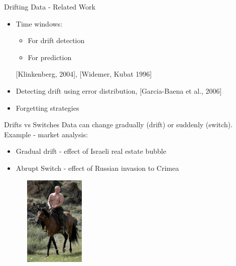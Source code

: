 \documentclass{beamer}
\begin{document}
\begin{frame}{Drifting Data - Related Work}


\begin{itemize}
\item Time windows:\newline
\begin{itemize}
\item For drift detection\newline
\item For prediction\newline
\end{itemize}
[Klinkenberg, 2004], [Widemer, Kubat 1996]\newline
\item Detecting drift using error distribution\newline\newline
[Gama et al., 2004], [Garcia-Baena et al., 2006]\newline
\item Forgetting strategies\newline{}
\end{itemize}
\end{frame}

\begin{frame}{Drifts vs Switches}
Data can change gradually (drift) or suddenly (switch). \newline\newline
Example - market analysis:\newline
\begin{itemize}
\item Gradual drift -  effect of Israeli real estate bubble
\item Abrupt Switch - effect of Russian invasion to Crimea 
\end{itemize}
\begin{center}
\includegraphics[height=1.7in,width=2.1in]{putin.jpg}
\end{center}
\end{frame}
\end{document}
